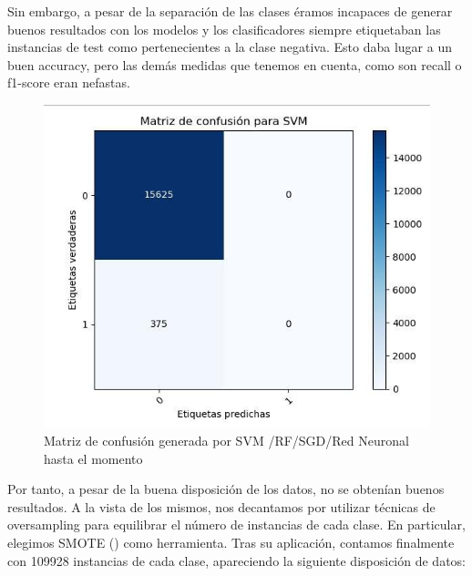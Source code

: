 Sin embargo, a pesar de la separación de las clases éramos incapaces de generar buenos resultados con los modelos y los clasificadores siempre etiquetaban las instancias de test como pertenecientes a la clase negativa. Esto daba lugar a un buen accuracy, pero las demás medidas que tenemos en cuenta, como son recall o f1-score eran nefastas.

\begin{figure}[H] %
	\centering
	\includegraphics[scale=0.6]{conf1.jpg}  %
	\caption{Matriz de confusión generada por SVM /RF/SGD/Red Neuronal hasta el momento} 
	\label{fig:conf1}
\end{figure}

Por tanto, a pesar de la buena disposición de los datos, no se obtenían buenos resultados. A la vista de los mismos, nos decantamos por utilizar técnicas de oversampling para equilibrar el número de instancias de cada clase. En particular, elegimos SMOTE (\cite{smote}) como herramienta. Tras su aplicación, contamos finalmente con 109928 instancias de cada clase, apareciendo la siguiente disposición de datos:


